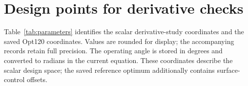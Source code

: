 \documentclass{anvil-paper}
\begin{document}
\section{Design points for derivative checks}\label{sec:parameters}
Table~\ref{tab:parameters} identifies the scalar derivative-study coordinates
and the saved Opt120 coordinates. Values are rounded for display; the accompanying records
retain full precision. The operating angle is stored in degrees and
converted to radians in the current equation. These coordinates describe
the scalar design space; the saved reference optimum additionally contains
surface-control offsets.
\begin{table}[H]\centering\small
\caption{Initial and interior perturbed design points for derivative
checks, alongside Opt120 for the forward validation. Lengths refer to the
unscaled geometry; surface-control offsets are retained in the data.}\label{tab:parameters}

\end{table}

\setlength{\bibsep}{3pt}


\end{document}
